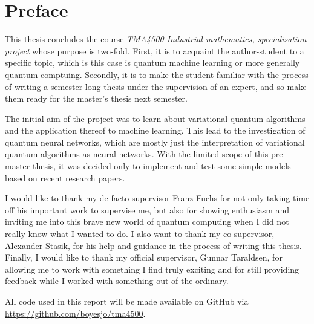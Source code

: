 \section*{Preface}
This thesis concludes the course \textit{TMA4500 Industrial mathematics, specialisation project} whose purpose is two-fold.
First, it is to acquaint the author-student to a specific topic, which is this case is quantum machine learning or more generally quantum comptuing.
Secondly, it is to make the student familiar with the process of writing a semester-long thesis under the supervision of an expert, and so make them ready for the master's thesis next semester.

The initial aim of the project was to learn about variational quantum algorithms and the application thereof to machine learning.
This lead to the investigation of quantum neural networks, which are mostly just the interpretation of variational quantum algorithms as neural networks.
With the limited scope of this pre-master thesis, it was decided only to implement and test some simple models based on recent research papers.

I would like to thank my de-facto supervisor Franz Fuchs for not only taking time off his important work to supervise me, but also for showing enthusiasm and inviting me into this brave new world of quantum computing when I did not really know what I wanted to do.
I also want to thank my co-supervisor, Alexander Stasik, for his help and guidance in the process of writing this thesis.
Finally, I would like to thank my official supervisor, Gunnar Taraldsen, for allowing me to work with something I find truly exciting and for still providing feedback while I worked with something out of the ordinary.

All code used in this report will be made available on GitHub via \url{https://github.com/boyesjo/tma4500}.



\cleardoublepage